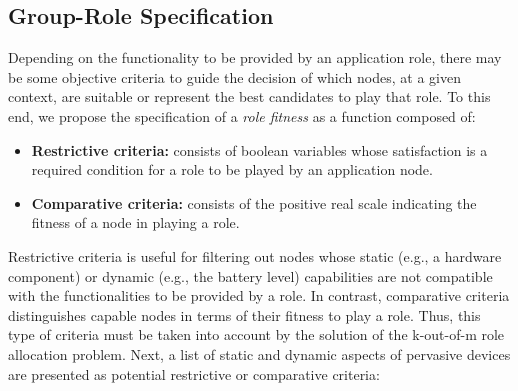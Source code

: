 \subsection{Group-Role Specification}\label{sec:group_specification}


Depending on the functionality to be provided by an application role, there may be some objective criteria to guide the decision of which nodes, at a given context, are suitable or represent the best candidates to play that role. To this end, we propose the specification of a \textit{role fitness} as a function composed of:

\begin{itemize}
	
	\item \textbf{Restrictive criteria:} consists of boolean variables whose satisfaction is a required condition for a role to be played by an application node.
	
	\item \textbf{Comparative criteria:} consists of the positive real scale indicating the fitness of a node in playing a role.
	
\end{itemize}


Restrictive criteria is useful for filtering out nodes whose static (e.g., a hardware component) or dynamic (e.g., the battery level) capabilities are not compatible with the functionalities to be provided by a role. In contrast, comparative criteria distinguishes capable nodes in terms of their fitness to play a role. Thus, this type of criteria must be taken into account by the solution of the k-out-of-m role allocation problem. Next, a list of static and dynamic aspects of pervasive devices are presented as potential restrictive or comparative criteria:


